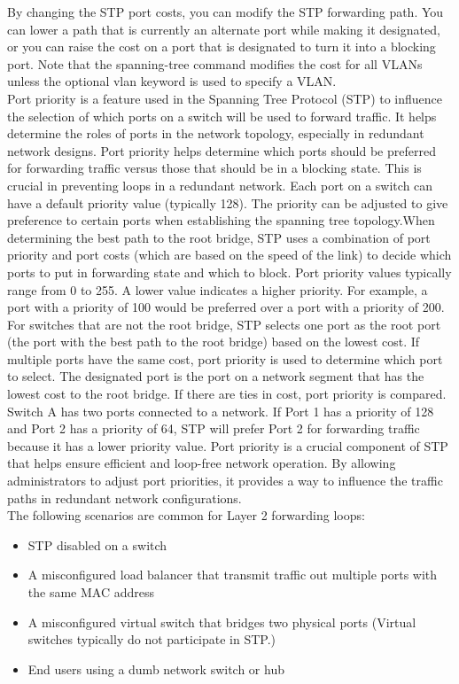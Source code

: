\documentclass{article}
\begin{document}
By changing the STP port costs, you can modify the STP forwarding path. You can lower a path that is currently an alternate port while making it designated, or you can raise the cost on a port that is designated to turn it into a blocking port. Note that the spanning-tree command modifies the cost for all VLANs unless the optional vlan keyword is used to specify a VLAN.\\

Port priority is a feature used in the Spanning Tree Protocol (STP) to influence the selection of which ports on a switch will be used to forward traffic. It helps determine the roles of ports in the network topology, especially in redundant network designs. Port priority helps determine which ports should be preferred for forwarding traffic versus those that should be in a blocking state. This is crucial in preventing loops in a redundant network. Each port on a switch can have a default priority value (typically 128). The priority can be adjusted to give preference to certain ports when establishing the spanning tree topology.When determining the best path to the root bridge, STP uses a combination of port priority and port costs (which are based on the speed of the link) to decide which ports to put in forwarding state and which to block. Port priority values typically range from 0 to 255. A lower value indicates a higher priority. For example, a port with a priority of 100 would be preferred over a port with a priority of 200. For switches that are not the root bridge, STP selects one port as the root port (the port with the best path to the root bridge) based on the lowest cost. If multiple ports have the same cost, port priority is used to determine which port to select. The designated port is the port on a network segment that has the lowest cost to the root bridge. If there are ties in cost, port priority is compared. Switch A has two ports connected to a network. If Port 1 has a priority of 128 and Port 2 has a priority of 64, STP will prefer Port 2 for forwarding traffic because it has a lower priority value. Port priority is a crucial component of STP that helps ensure efficient and loop-free network operation. By allowing administrators to adjust port priorities, it provides a way to influence the traffic paths in redundant network configurations.\\

The following scenarios are common for Layer 2 forwarding loops:
\begin{itemize}
\item STP disabled on a switch
\item A misconfigured load balancer that transmit traffic out multiple ports with the same MAC address
\item A misconfigured virtual switch that bridges two physical ports (Virtual switches typically do not participate in STP.)
\item End users using a dumb network switch or hub
\end{itemize}
\end{document}

